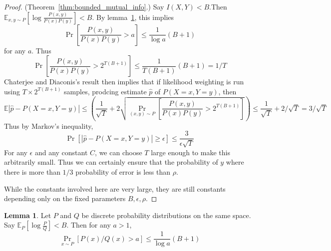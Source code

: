 \documentclass{article}
\theoremstyle{definition}
\newtheorem{lem}[thm]{Lemma}
\theoremstyle{remark}
\begin{document}
\begin{proof}{(Theorem~\ref{thm:bounded_mutual_info}.)}
Say $I(X, Y) < B$.Then
$\mathbb{E}_{x, y \sim P}[\log \frac{P(x, y)}{P(x)P(y)}] < B$.
By lemma~\ref{lem:pqbound},
this implies
$$
\Pr[\frac{P(x, y)}{P(x)P(y)} > a] \leq \frac{1}{\log a}(B + 1)
$$
for any $a$. Thus
$$
\Pr[\frac{P(x, y)}{P(x)P(y)} > 2^{T(B + 1)}] \leq \frac{1}{T(B + 1)}(B + 1) = 1/T
$$
Chaterjee and Diaconis's result then implies that if 
likelihood weighting is run using $T \times 2^{T(B + 1)}$ samples,
prodcing estimate $\hat{p}$ of $P(X = x, Y = y)$,
then
$$
\mathbb{E}|\hat{p} - P(X = x, Y = y)| \leq (\frac{1}{\sqrt{T}} + 2 \sqrt{\Pr_{(x, y) \sim P}[\frac{P(x, y)}{P(x)P(y)} > 2^{T(B + 1)}]}) \leq \frac{1}{\sqrt{T}} + 2/\sqrt{T} = 3/\sqrt{T}
$$
Thus by Markov's inequality,
$$
\Pr [|\hat{p} - P(X = x, Y = y)| \geq \epsilon] \leq \frac{3}{\epsilon \sqrt{T}}
$$
For any $\epsilon$ and any constant $C$, we can choose $T$ large enough to make this arbitrarily small.
Thus we can certainly ensure that the probability of $y$ where there is more than $1/3$ probability of error is less than $\rho$.

While the constants involved here are very large, they are still constants depending only on the fixed parameters $B, \epsilon, \rho$.

\end{proof}

\begin{lem} \label{lem:pqbound}
Let $P$ and $Q$ be discrete probability distributions on the same space.
Say $\mathbb{E}_{P}[\log \frac{P}{Q}] < B$.
Then for any $a > 1$,
$$
\Pr_{x \sim P}[P(x)/Q(x) > a] \leq \frac{1}{\log a}(B + 1)
$$
\end{lem}

\printbibliography
\end{document}
